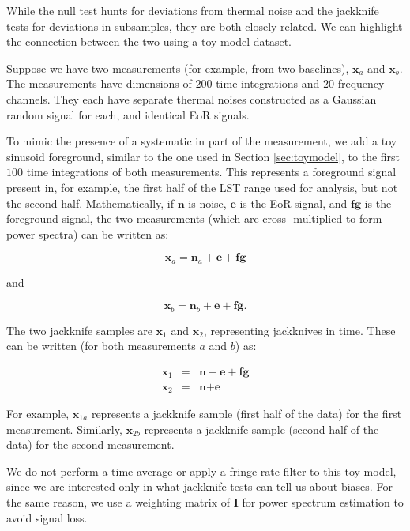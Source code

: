 \documentclass[preprint2,numberedappendix,tighten]{aastex6}  %
\begin{document}
While the null test hunts for deviations from thermal noise and the jackknife tests for deviations in subsamples, they are both 
closely related. We can highlight the connection between the two using a toy model dataset.

Suppose we have two measurements (for example, from two baselines), $\textbf{x}_{a}$ and $\textbf{x}_{b}$. The 
measurements have dimensions of $200$ time integrations and $20$ frequency channels. They each have separate thermal 
noises constructed as a Gaussian random signal for each, and identical EoR signals. 

To mimic the presence of a systematic in part of the measurement, we add a toy sinusoid foreground, similar to the one used in 
Section \ref{sec:toymodel}, to the first $100$ time integrations of both measurements. This represents a foreground signal 
present in, for example, the first half of the LST range used for analysis, but not the second half. Mathematically, if  $\textbf{n}$ 
is noise, $\textbf{e}$ is the EoR signal, and $\textbf{fg}$ is the foreground signal, the two measurements (which are cross-
multiplied to form power spectra) can be written as:

\begin{equation}
\label{eq:bias1}
\textbf{x}_{a} = \textbf{n}_{a} + \textbf{e} + \textbf{fg}
\end{equation} 

\noindent and 

\begin{equation}
\label{eq:bias2}
\textbf{x}_{b} = \textbf{n}_{b} + \textbf{e} + \textbf{fg}.
\end{equation}

\noindent The two jackknife samples are $\textbf{x}_{1}$ and $\textbf{x}_{2}$, representing jackknives in time. These can be 
written (for both measurements $a$ and $b$) as:

\begin{eqnarray}
\textbf{x}_{1} &=& \textbf{n} + \textbf{e} + \textbf{fg} \\
\textbf{x}_{2} &=& \textbf{n} + \textbf{e} 
\end{eqnarray}

\noindent For example, $\textbf{x}_{1a}$ represents a jackknife sample (first half of the data) for the first measurement. 
Similarly, $\textbf{x}_{2b}$ represents a jackknife sample (second half of the data) for the second measurement.

We do not perform a time-average or apply a fringe-rate filter to this toy model, since we are interested only in what jackknife 
tests can tell us about biases. For the same reason, we use a weighting matrix of $\textbf{I}$ for power spectrum estimation to 
avoid signal loss. 
\end{document}
